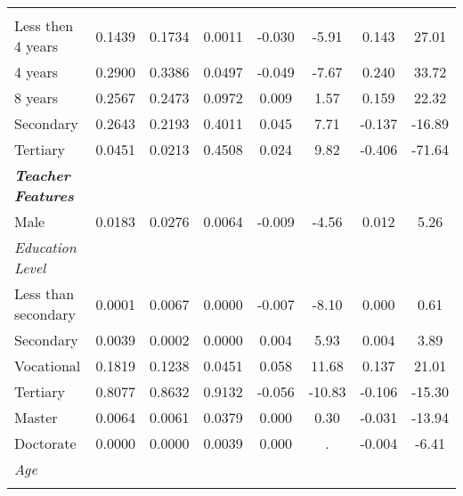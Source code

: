 \documentclass[a4paper, 12pt]{article}
\newcommand{\sym}[1]{\rlap{#1}}%
\begin{document}
\begin{longtable}{@{\extracolsep{1pt}}l*{7}{c}@{}}
\begin{adjustbox}{scale=0.9}
\begin{tabular}{l*{1}{ccccccc}}
\emph{Education Father}&            &            &            &                     &            &                     &            \\
Less then 4 years&      0.1439&      0.1734&      0.0011&       -0.030\sym{***}&       -5.91&       0.143\sym{***}&       27.01\\
4 years     &      0.2900&      0.3386&      0.0497&       -0.049\sym{***}&       -7.67&       0.240\sym{***}&       33.72\\
8 years     &      0.2567&      0.2473&      0.0972&       0.009         &        1.57&       0.159\sym{***}&       22.32\\
Secondary   &      0.2643&      0.2193&      0.4011&      0.045\sym{***}&        7.71&      -0.137\sym{***}&      -16.89\\
Tertiary    &      0.0451&      0.0213&      0.4508&      0.024\sym{***}&        9.82&      -0.406\sym{***}&      -71.64\\
\textbf{\emph{Teacher Features}}&            &            &            &                     &            &                     &            \\
Male        &      0.0183&      0.0276&      0.0064&       -0.009\sym{***}&       -4.56&       0.012\sym{***}&        5.26\\
\emph{Education Level}&            &            &            &                     &            &                     &            \\
Less than secondary&      0.0001&      0.0067&      0.0000&       -0.007\sym{***}&       -8.10&       0.000         &        0.61\\
Secondary   &      0.0039&      0.0002&      0.0000&       0.004\sym{***}&        5.93&       0.004\sym{***}&        3.89\\
Vocational  &      0.1819&      0.1238&      0.0451&       0.058\sym{***}&       11.68&       0.137\sym{***}&       21.01\\
Tertiary    &      0.8077&      0.8632&      0.9132&      -0.056\sym{***}&      -10.83&      -0.106\sym{***}&      -15.30\\
Master      &      0.0064&      0.0061&      0.0379&      0.000         &        0.30&      -0.031\sym{***}&      -13.94\\
Doctorate   &      0.0000&      0.0000&      0.0039&      0.000         &           .&      -0.004\sym{***}&       -6.41\\
\emph{Age}  &            &            &            &                     &            &                     &            \\

\end{tabular}
\end{adjustbox}
\end{longtable}
\end{document}
